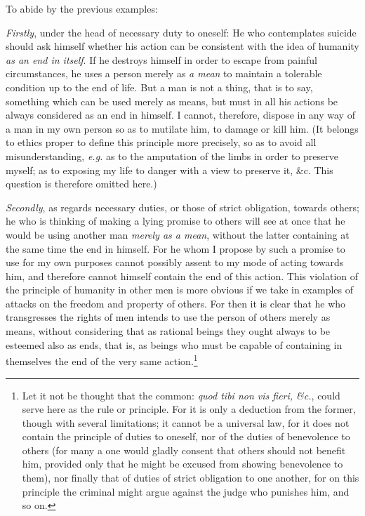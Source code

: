 To abide by the previous examples:

\textit{Firstly}, under the head of necessary duty to oneself: He who
contemplates suicide should ask himself whether his action can be
consistent with the idea of humanity \textit{as an end in itself}. If
he destroys himself in order to escape from painful circumstances, he
uses a person merely as \textit{a mean} to maintain a tolerable
condition up to the end of life. But a man is not a thing, that is to
say, something which can be used merely as means, but must in all his
actions be always considered as an end in himself. I cannot,
therefore, dispose in any way of a man in my own person so as to
mutilate him, to damage or kill him. (It belongs to ethics proper to
define this principle more precisely, so as to avoid all
misunderstanding, \textit{e.g.} as to the amputation of the limbs in
order to preserve myself; as to exposing my life to danger with a view
to preserve it, \&c. This question is therefore omitted here.)

\textit{Secondly}, as regards necessary duties, or those of strict
obligation, towards others; he who is thinking of making a lying
 promise to others will see at once that he would be using
another man \textit{merely as a mean}, without the latter containing
at the same time the end in himself. For he whom I propose by such a
promise to use for my own purposes cannot possibly assent to my mode
of acting towards him, and therefore cannot himself contain the end of
this action. This violation of the principle of humanity in other men
is more obvious if we take in examples of attacks on the freedom and
property of others. For then it is clear that he who transgresses the
rights of men intends to use the person of others merely as means,
without considering that as rational beings they ought always to be
esteemed also as ends, that is, as beings who must be capable of
containing in themselves the end of the very same action.\footnote{Let
it not be thought that the common: \textit{quod tibi non vis fieri,
\&c.}, could serve here as the rule or principle. For it is only a
deduction from the former, though with several limitations; it cannot
be a universal law, for it does not contain the principle of duties to
oneself, nor of the duties of benevolence to others (for many a one
would gladly consent that others should not benefit him, provided only
that he might be excused from showing benevolence to them), nor
finally that of duties of strict obligation to one another, for on
this principle the criminal might argue against the judge who punishes
him, and so on.}

